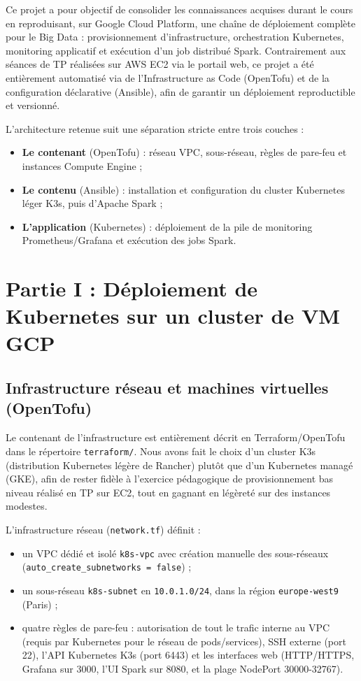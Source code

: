 \documentclass{name}
\begin{document}
Ce projet a pour objectif de consolider les connaissances acquises durant le cours en reproduisant, sur Google Cloud Platform, une chaîne de déploiement complète pour le Big Data : provisionnement d'infrastructure, orchestration Kubernetes, monitoring applicatif et exécution d'un job distribué Spark. Contrairement aux séances de TP réalisées sur AWS EC2 via le portail web, ce projet a été entièrement automatisé via de l'Infrastructure as Code (OpenTofu) et de la configuration déclarative (Ansible), afin de garantir un déploiement reproductible et versionné.

L'architecture retenue suit une séparation stricte entre trois couches :
\begin{itemize}
    \item \textbf{Le contenant} (OpenTofu) : réseau VPC, sous-réseau, règles de pare-feu et instances Compute Engine ;
    \item \textbf{Le contenu} (Ansible) : installation et configuration du cluster Kubernetes léger K3s, puis d'Apache Spark ;
    \item \textbf{L'application} (Kubernetes) : déploiement de la pile de monitoring Prometheus/Grafana et exécution des jobs Spark.
\end{itemize}

\section{Partie I : Déploiement de Kubernetes sur un cluster de VM GCP}

\subsection{Infrastructure réseau et machines virtuelles (OpenTofu)}

Le contenant de l'infrastructure est entièrement décrit en Terraform/OpenTofu dans le répertoire \texttt{terraform/}. Nous avons fait le choix d'un cluster K3s (distribution Kubernetes légère de Rancher) plutôt que d'un Kubernetes managé (GKE), afin de rester fidèle à l'exercice pédagogique de provisionnement bas niveau réalisé en TP sur EC2, tout en gagnant en légèreté sur des instances modestes.

L'infrastructure réseau (\texttt{network.tf}) définit :
\begin{itemize}
    \item un VPC dédié et isolé \texttt{k8s-vpc} avec création manuelle des sous-réseaux (\texttt{auto\_create\_subnetworks = false}) ;
    \item un sous-réseau \texttt{k8s-subnet} en \texttt{10.0.1.0/24}, dans la région \texttt{europe-west9} (Paris) ;
    \item quatre règles de pare-feu : autorisation de tout le trafic interne au VPC (requis par Kubernetes pour le réseau de pods/services), SSH externe (port 22), l'API Kubernetes K3s (port 6443) et les interfaces web (HTTP/HTTPS, Grafana sur 3000, l'UI Spark sur 8080, et la plage NodePort 30000-32767).
\end{itemize}
\end{document}
